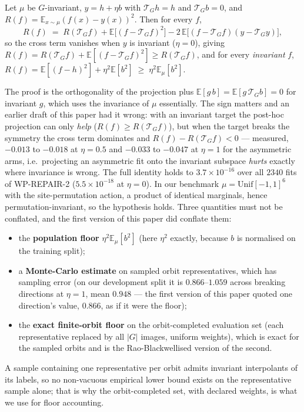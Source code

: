\documentclass[11pt]{article}
\newcommand{\Tg}{\mathcal{T}_G}
\begin{document}
\begin{proposition}
\label{prop:floor}
Let $\mu$ be $G$-invariant, $y=h+\eta b$ with $\Tg h=h$ and $\Tg b=0$, and
$R(f)=\mathbb{E}_{x\sim\mu}(f(x)-y(x))^2$. Then for every $f$,
\begin{equation}
  R(f)\;=\;R(\Tg f)+\mathbb{E}\bigl[(f-\Tg f)^2\bigr]-2\,\mathbb{E}\bigl[(f-\Tg f)(y-\Tg y)\bigr],
\end{equation}
so the cross term vanishes when $y$ is invariant ($\eta=0$), giving
$R(f)=R(\Tg f)+\mathbb{E}[(f-\Tg f)^2]\ge R(\Tg f)$, and for every \emph{invariant} $f$,
$R(f)=\mathbb{E}[(f-h)^2]+\eta^2\mathbb{E}[b^2]\;\ge\;\eta^2\mathbb{E}_\mu[b^2]$.
\end{proposition}

The proof is the orthogonality of the projection plus
$\mathbb{E}[g\,b]=\mathbb{E}[g\,\Tg b]=0$ for invariant $g$, which uses the invariance of
$\mu$ essentially. The sign matters and an earlier draft of this paper had it wrong: with
an invariant target the post-hoc projection can only \emph{help} ($R(f)\ge R(\Tg f)$), but
when the target breaks the symmetry the cross term dominates and $R(f)-R(\Tg f)<0$ ---
measured, $-0.013$ to $-0.018$ at $\eta{=}0.5$ and $-0.033$ to $-0.047$ at $\eta{=}1$ for
the asymmetric arms, i.e.\ projecting an asymmetric fit onto the invariant subspace
\emph{hurts} exactly where invariance is wrong. The full identity holds to
$3.7\times10^{-16}$ over all $2340$ fits of WP-REPAIR-2 ($5.5\times10^{-18}$ at
$\eta{=}0$). In our benchmark $\mu=\mathrm{Unif}[-1,1]^6$ with the site-permutation
action, a product of identical marginals, hence permutation-invariant, so the hypothesis
holds. Three quantities must not be conflated, and the first version of this paper did
conflate them:
\begin{itemize}[leftmargin=1.4em,itemsep=1pt,topsep=1pt]
  \item the \textbf{population floor} $\eta^2\mathbb{E}_\mu[b^2]$ (here $\eta^2$ exactly,
        because $b$ is normalised on the training split);
  \item a \textbf{Monte-Carlo estimate} on sampled orbit representatives, which has
        sampling error (on our development split it is $0.866$--$1.059$ across breaking
        directions at $\eta{=}1$, mean $0.948$ --- the first version of this paper quoted
        one direction's value, $0.866$, as if it were the floor);
  \item the \textbf{exact finite-orbit floor} on the orbit-completed evaluation set (each
        representative replaced by all $|G|$ images, uniform weights), which is exact for
        the sampled orbits and is the Rao-Blackwellised version of the second.
\end{itemize}
A sample containing one representative per orbit admits invariant interpolants of its
labels, so no non-vacuous empirical lower bound exists on the representative sample
alone; that is why the orbit-completed set, with declared weights, is what we use for
floor accounting.
\end{document}
